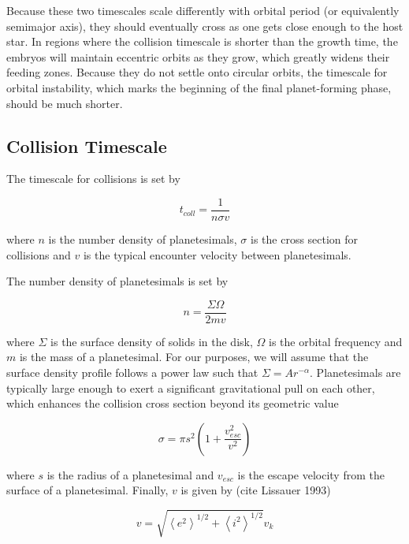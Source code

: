 \documentclass[onecolumn]{aastex63}
\begin{document}
Because these two timescales scale differently with orbital period (or equivalently semimajor axis), they should eventually cross as one gets close enough to the host star. In regions where the collision timescale is shorter than the growth time, the embryos will maintain eccentric orbits as they grow, which greatly widens their feeding zones. Because they do not settle onto circular orbits, the timescale for orbital instability, which marks the beginning of the final planet-forming phase, should be much shorter.

\subsection{Collision Timescale}

The timescale for collisions is set by

\begin{equation}
	t_{coll} = \frac{1}{n \sigma v}
\end{equation}

\noindent where $n$ is the number density of planetesimals, $\sigma$ is the cross section for collisions and $v$ is the typical encounter velocity between planetesimals. 

The number density of planetesimals is set by

\begin{equation}
    n = \frac{\Sigma \Omega}{2 m v}
\end{equation}

\noindent where $\Sigma$ is the surface density of solids in the disk, $\Omega$ is the orbital frequency and $m$ is the mass of a planetesimal. For our purposes, we will assume that the surface density profile follows a power law such that $\Sigma = A r^{-\alpha}$. Planetesimals are typically large enough to exert a significant gravitational pull on each other, which enhances the collision cross section beyond its geometric value

\begin{equation}
	\sigma = \pi s^{2} \left( 1 + \frac{v_{esc}^{2}}{v^{2}} \right)
\end{equation}

\noindent where $s$ is the radius of a planetesimal and $v_{esc}$ is the escape velocity from the surface of a planetesimal. Finally, $v$ is given by (cite Lissauer 1993)

\begin{equation}
	v = \sqrt{\left<  e^{2} \right>^{1/2} + \left< i^{2} \right>^{1/2}} v_{k}
\end{equation}
\end{document}
